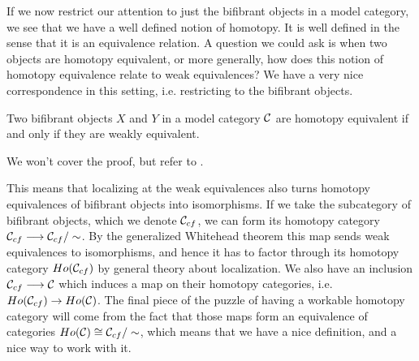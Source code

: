 If we now restrict our attention to just the bifibrant objects in a model category, we see that we have a well defined notion of homotopy. It is well defined in the sense that it is an equivalence relation. A question we could ask is when two objects are homotopy equivalent, or more generally, how does this notion of homotopy equivalence relate to weak equivalences? We have a very nice correspondence in this setting, i.e. restricting to the bifibrant objects. 

\begin{theorem}
Two bifibrant objects $X$ and $Y$ in a model category $\mathcal{C}$ are homotopy equivalent if and only if they are weakly equivalent. 
\end{theorem}

We won't cover the proof, but refer to \cite[Theorem 1.2.10.]{hovey}. 

This means that localizing at the weak equivalences also turns homotopy equivalences of bifibrant objects into isomorphisms. If we take the subcategory of bifibrant objects, which we denote $\mathcal{C}_{cf}$, we can form its homotopy category $\mathcal{C}_{cf}\longrightarrow \mathcal{C}_{cf}/\sim$. By the generalized Whitehead theorem this map sends weak equivalences to isomorphisms, and hence it has to factor through its homotopy category $Ho(\mathcal{C}_{cf})$ by general theory about localization. We also have an inclusion $\mathcal{C}_{cf} \longrightarrow \mathcal{C}$ which induces a map on their homotopy categories, i.e. $Ho(\mathcal{C}_{cf})\rightarrow Ho(\mathcal{C})$. The final piece of the puzzle of having a workable homotopy category will come from the fact that those maps form an equivalence of categories $Ho(\mathcal{C})\cong \mathcal{C}_{cf}/\sim$, which means that we have a nice definition, and a nice way to work with it.











